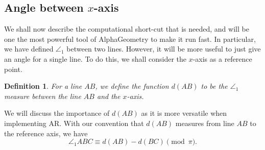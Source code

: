 \documentclass[reqno]{amsart}
\DeclareMathOperator{\1}{\textbf{1}}
\newtheorem{defn}[thm]{Definition}
\begin{document}
\subsection{Angle between $x$-axis}\label{sec: d(AB)}

We shall now describe the computational short-cut that is needed, and will be
one the most powerful tool of AlphaGeometry to make it run fast. In particular,
we have defined $\angle_1$ between two lines. However, it will be more useful to
just give an angle for a single line. To do this, we shall consider the $x$-axis
as a reference point.

\begin{defn}
    For a line $AB$, we define the function $d(AB)$ to be the $\angle_1$ measure
    between the line $AB$ and the $x$-axis.
\end{defn}

\begin{center}
\end{center}
We will discuss the importance of $d(AB)$ as it is more versatile when
implementing AR.  With our convention that $d(AB)$ measures from line $AB$ to
the reference axis, we have
\[
  \angle_1ABC \equiv d(AB)-d(BC)\pmod\pi.
\]
\end{document}
